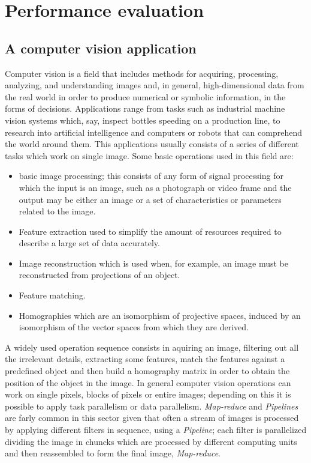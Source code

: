 \documentclass[a4paper,12pt,oneside]{book}
\begin{document}
\chapter{Performance evaluation}
\section{A computer vision application}
\label{test}

Computer vision is a field that includes methods for acquiring, processing, analyzing, and understanding images and, in general, high-dimensional data from the real world in order to produce numerical or symbolic information, in the forms of decisions. Applications range from tasks such as industrial machine vision systems which, say, inspect bottles speeding on a production line, to research into artificial intelligence and computers or robots that can comprehend the world around them. This applications usually consists of a series of different tasks which work on single image. Some basic operations used in this field are:
\begin{itemize}
\item{basic image processing; this consists of any form of signal processing for which the input is an image, such as a photograph or video frame and the output may be either an image or a set of characteristics or parameters related to the image.}
\item{Feature extraction used to simplify the amount of resources required to describe a large set of data accurately.}
\item{Image reconstruction which is used when, for example, an image must be reconstructed from projections of an object.}
\item{Feature matching.}
\item{Homographies which are an isomorphism of projective spaces, induced by an isomorphism of the vector spaces from which they are derived.}
\end{itemize}

A widely used operation sequence consists in aquiring an image, filtering out all the irrelevant details, extracting some features, match the features against a predefined object and then build a homography matrix in order to obtain the position of the object in the image. In general computer vision operations can work on single pixels, blocks of pixels or entire images; depending on this it is possible to apply task parallelism or data parallelism. \emph{Map-reduce} and \emph{Pipelines} are farly common in this sector given that often a stream of images is processed by applying different filters in sequence, using a \emph{Pipeline}; each filter is parallelized dividing the image in chuncks which are processed by different computing units and then reassembled to form the final image, \emph{Map-reduce}.
\end{document}
